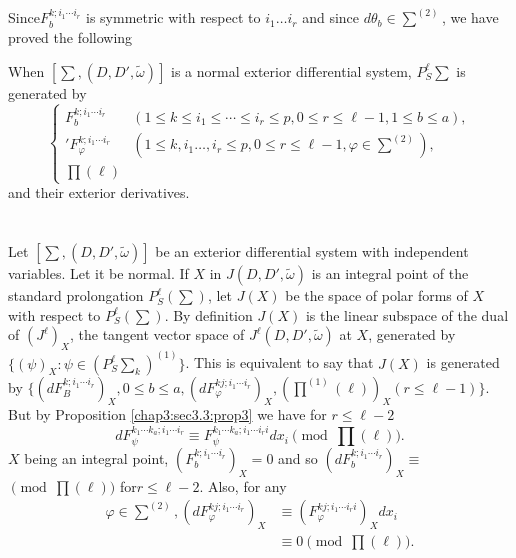 Since\pageoriginale $F^{k;i_1 \cdots i_r}_{b}$ is symmetric with
respect to $i_1\ldots i_r$ and since $d \theta_b \in \sum^{(2)}$, we
have proved the following 

\begin{proposition}\label{chap3:sec3.5:prop9}%
  When $[ \sum , (D, D', \tilde{\omega})]$ is a normal exterior
  differential system, $P^{\ell}_S \sum$ is generated by  
  $$
  \begin{cases}
    F^{k;i_1 \cdots i_r}_{b} &(1 \leq k \leq i_1 \leq \cdots \leq i_r
    \leq p, 0\leq r \leq \ell -1 , 1 \leq b \leq a),\\ 
    'F^{k;i_1 \cdots i_r}_{\varphi} &(1 \leq k, i_1 \ldots , i_r \leq
    p,0 \leq r \leq \ell -1, \varphi \in \sum^{(2)}),\\ 
    \prod(\ell)
  \end{cases}
  $$
  and their exterior derivatives.
\end{proposition}

\section{}\label{chap3:sec3.6} %

Let $[\sum, (D,D', \tilde{\omega})]$ be an exterior differential
system with independent variables. Let it be normal. If $X$ in $J
(D,D', \tilde{\omega})$ is an integral  point of the standard
prolongation $P^{\ell}_S (\sum)$, let $J(X)$ be the space of polar
forms of $X$ with respect to $P^{\ell}_S (\sum)$. By definition $J(X)$
is the linear subspace of the dual of $(J^{\ell})_X$, the tangent
vector space of $J^{\ell}(D,D', \tilde{\omega})$ at $X$, generated by
$\{(\psi)_X : \psi \in (P^{\ell}_S \sum_k)^{(1)} \}$. This is
equivalent to say that $J(X)$ is generated by $\{(dF^{k;i_1 \cdots
  i_r}_B)_X, 0 \leq b \leq a, (dF _{\varphi}^{kj; i_1 \cdots i_r})_X,
(\prod^{(1)} (\ell))_X (r \leq \ell -1)\}$. But by Proposition
\ref{chap3:sec3.3:prop3} we
have for $r \leq \ell -2$ 
$$
dF^{k_1 \cdots k_a ; i_1 \cdots i_r}_{\psi} \equiv F^{k_1 \cdots k_a ;
  i_1 \cdots i_r i}_{\psi} dx_i \pmod {\prod (\ell)}. 
$$
$X$ being an integral point, $(F^{k;i_1  \cdots i_r}_b)_X= 0$ and so
$(dF^{k;i_1  \cdots i_r}_b)_X \equiv$\break  $\pmod {\prod (\ell)}$ for\pageoriginale $r \leq
\ell -2$. Also, for any  
\begin{align*}
  \varphi \in {\textstyle\sum^{(2)}}, (dF^{kj;i_1  \cdots i_r}_\varphi)_X & \equiv
  (F^{kj;i_1  \cdots i_r i}_\varphi )_X dx_i\\ 
  & \equiv 0 \pmod {\prod (\ell)}.
\end{align*}

